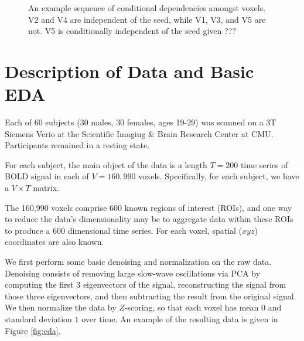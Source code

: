 \documentclass[11pt]{article}
\begin{document}
\begin{figure}[h]
\centering
{}
\caption{An example sequence of conditional dependencies amongst voxels. V2 and
V4 are independent of the seed, while V1, V3, and V5 are not. V5 is
conditionally independent of the seed given ???}
\end{figure}

\section{Description of Data and Basic EDA}
Each of 60 subjects (30 males, 30 females, ages 19-29) was scanned on a 3T
Siemens Verio at the Scientific Imaging \& Brain Research Center at CMU.
Participants remained in a resting state.

For each subject, the main object of the data is a length $T = 200$ time series
of BOLD signal in each of $V = 160,990$ voxels. Specifically, for each subject,
we have a $V \times T$ matrix.

The 160,990 voxels comprise $600$ known regions of interest (ROIs), and one way
to reduce the data's dimensionality may be to aggregate data within these ROIs
to produce a $600$ dimensional time series. For each voxel, spatial ($xyz$)
coordinates are also known.

We first perform some basic denoising and normalization on the raw data.
Denoising consists of removing large slow-wave oscillations via PCA by
computing the first $3$ eigenvectors of the signal, reconstructing the signal
from those three eigenvectors, and then subtracting the result from the
original signal. We then normalize the data by $Z$-scoring, so that each voxel
has mean $0$ and standard deviation $1$ over time. An example of the resulting
data is given in Figure \ref{fig:eda}.
\end{document}

